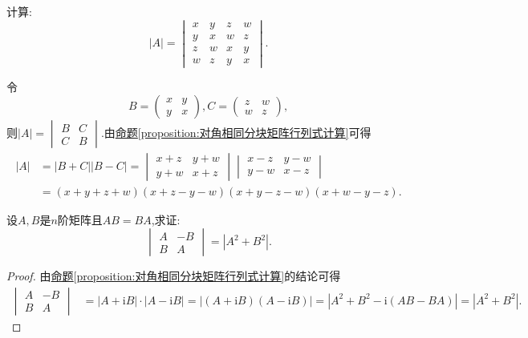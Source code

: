 \documentclass[../../main.tex]{subfiles}%
\begin{document}
\begin{example}
计算:
\[
|A| = 
\begin{vmatrix}
x & y & z & w\\
y & x & w & z\\
z & w & x & y\\
w & z & y & x
\end{vmatrix}.
\]
\end{example}
\begin{solution}
令
\[
B = 
\begin{pmatrix}
x & y\\
y & x
\end{pmatrix},
C = 
\begin{pmatrix}
z & w\\
w & z
\end{pmatrix},
\]
则\(|A| = 
\begin{vmatrix}
B & C\\
C & B
\end{vmatrix}\).由\hyperref[proposition:对角相同分块矩阵行列式计算]{命题\ref{proposition:对角相同分块矩阵行列式计算}}可得
\begin{align*}
|A|&=|B + C||B - C|
=\begin{vmatrix}
x + z & y + w\\
y + w & x + z
\end{vmatrix}\begin{vmatrix}
x - z & y - w\\
y - w & x - z
\end{vmatrix}\\
&=(x + y + z + w)(x + z - y - w)(x + y - z - w)(x + w - y - z).
\end{align*}

\end{solution}

\begin{example}\label{example:2.28}
设\(A,B\)是\(n\)阶矩阵且\(AB = BA\),求证:
\[
\begin{vmatrix}
A & -B\\
B & A
\end{vmatrix}=|A^2 + B^2|.
\]
\end{example}
\begin{proof}
由\hyperref[proposition:对角相同分块矩阵行列式计算]{命题\ref{proposition:对角相同分块矩阵行列式计算}}的结论可得
\begin{align*}
\begin{vmatrix}
A & -B\\
B & A
\end{vmatrix}&=|A + \mathrm{i}B|\cdot|A - \mathrm{i}B|
=|(A + \mathrm{i}B)(A - \mathrm{i}B)|
=|A^2 + B^2 - \mathrm{i}(AB - BA)|
=|A^2 + B^2|.
\end{align*}
\end{proof}
\end{document}
